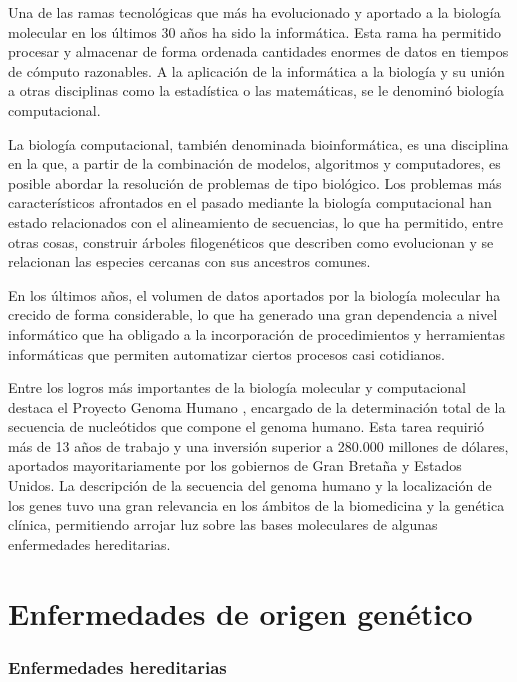 \medskip
Una de las ramas tecnológicas que más ha evolucionado y aportado a la biología molecular en los últimos 30 años ha sido la informática. Esta rama ha  permitido procesar y almacenar de forma ordenada cantidades enormes de datos en tiempos de cómputo razonables. A la aplicación de la informática a la biología y su unión a otras disciplinas como la estadística o las matemáticas, se le denominó biología computacional.
  
\medskip 
La biología computacional, también denominada bioinformática, es una disciplina en la que, a partir de la combinación de modelos, algoritmos y computadores, es posible abordar la resolución de problemas de tipo biológico. Los problemas más característicos afrontados en el pasado mediante la biología computacional han estado relacionados con el alineamiento de secuencias, lo que ha permitido, entre otras cosas, construir árboles filogenéticos que describen como evolucionan y se relacionan las especies cercanas con sus ancestros comunes.

\medskip
En los últimos años, el volumen de datos aportados por la biología molecular ha crecido de forma considerable, lo que ha generado una gran dependencia a nivel informático que ha obligado a la incorporación de procedimientos y herramientas informáticas que permiten automatizar ciertos procesos casi cotidianos.  

\medskip
Entre los logros más importantes de la biología molecular y computacional destaca el Proyecto Genoma Humano \cite{pgh}, encargado de la determinación total de la secuencia de nucleótidos que compone el genoma humano. Esta tarea requirió más de 13 años de trabajo y una inversión superior a 280.000 millones de dólares, aportados mayoritariamente por los gobiernos de Gran Bretaña y Estados Unidos. La descripción de la secuencia del genoma humano y la localización de los genes tuvo una gran relevancia en los ámbitos de la biomedicina y la genética clínica, permitiendo arrojar luz sobre las bases moleculares de algunas enfermedades hereditarias.

\section{Enfermedades de origen genético}

\subsubsection{Enfermedades hereditarias}

